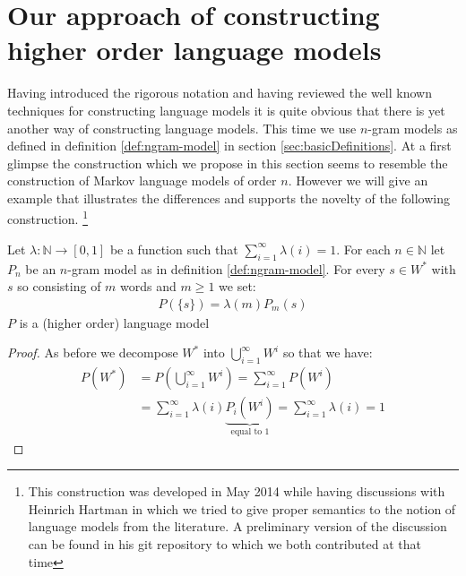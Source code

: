 \documentclass[•]{book}
\begin{document}
\section{Our approach of constructing higher order language models}
Having introduced the rigorous notation and having reviewed the well known techniques for constructing language models it is quite obvious that there is yet another way of constructing language models. 
This time we use $n$-gram models as defined in definition \ref{def:ngram-model} in section \ref{sec:basicDefinitions}. 
At a first glimpse the construction which we propose in this section seems to resemble the construction of Markov language models of order $n$. 
However we will give an example that illustrates the differences and supports the novelty of the following construction. \footnote{This construction was developed in May 2014 while having discussions with Heinrich Hartman in which we tried to give proper semantics to the notion of language models from the literature. A preliminary version of the discussion can be found in his git repository to which we both contributed at that time }
\begin{theorem}\label{thm:higherOrderLM}
Let $\lambda:\mathbb{N}\longrightarrow [0,1]$ be a function such that $\sum_{i=1}^\infty\lambda(i) = 1$. 
For each $n\in\mathbb{N}$ let $P_n$ be an $n$-gram model as in definition \ref{def:ngram-model}. 
For every $s \in W^{*}$ with $s$ so consisting of $m$ words and $m\geq 1$ we set:
\begin{align}
P(\{s\}) = \lambda(m)P_m({s})
\end{align}
$P$ is a (higher order) language model 
\begin{proof}
As before we decompose $W^{*}$ into $\bigcup_{i=1}^\infty W^{i}$ so that we have:
\begin{align}
P(W^{*}) & = P(\bigcup_{i=1}^\infty W^{i}) =\sum_{i=1}^\infty P(W^{i})  \\
& =  \sum_{i=1}^\infty \lambda(i)\underbrace{P_i(W^{i})}_{\text{equal to 1}} = \sum_{i=1}^\infty \lambda(i) = 1
\end{align} 
\end{proof}
\end{theorem}
\end{document}
